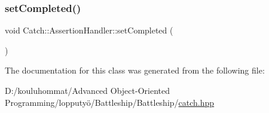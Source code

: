 \subsubsection{\texorpdfstring{set\+Completed()}{setCompleted()}}
{\footnotesize\ttfamily void Catch\+::\+Assertion\+Handler\+::set\+Completed (\begin{DoxyParamCaption}{ }\end{DoxyParamCaption})}



The documentation for this class was generated from the following file\+:\begin{DoxyCompactItemize}
\item 
D\+:/kouluhommat/\+Advanced Object-\/\+Oriented Programming/lopputyö/\+Battleship/\+Battleship/\mbox{\hyperlink{catch_8hpp}{catch.\+hpp}}\end{DoxyCompactItemize}
